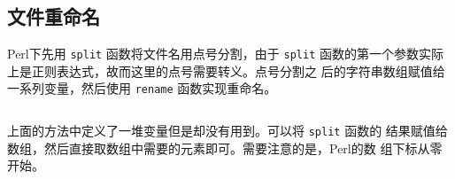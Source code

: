 \subsection{文件重命名}
\label{subsec:rename-in-perl}
Perl下先用 \texttt{split} 函数将文件名用点号分割，由于 \texttt{split}
函数的第一个参数实际上是正则表达式，故而这里的点号需要转义。点号分割之
后的字符串数组赋值给一系列变量，然后使用 \texttt{rename} 函数实现重命名。
\inputminted{perl}{./call-in-script/rename1.pl}

上面的方法中定义了一堆变量但是却没有用到。可以将 \texttt{split} 函数的
结果赋值给数组，然后直接取数组中需要的元素即可。需要注意的是，Perl的数
组下标从零开始。
\inputminted{perl}{./call-in-script/rename2.pl}
